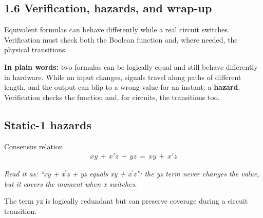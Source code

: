 \documentclass[11pt]{article}
\begin{document}
\begin{keepsection}
\section{1.6 Verification, hazards, and wrap-up}

Equivalent formulas can behave differently while a real circuit switches. Verification must check both the Boolean function and, where needed, the physical transitions.

\begin{plainbox}\textbf{In plain words:} two formulas can be logically equal and still behave differently in hardware. While an input changes, signals travel along paths of different length, and the output can blip to a wrong value for an instant: a \textbf{hazard}. Verification checks the function and, for circuits, the transitions too.\end{plainbox}

\begin{keepsection}
\subsection{Static-1 hazards}

\begin{equationcard}{Consensus relation}
\[ \begin{gathered} {x}{y}\, +\, {x}'{z}\, +\, {y}{z}\, =\, {x}{y}\, +\, {x}'{z} \end{gathered} \]
{\small \emph{Read it as: “xy + x\ensuremath{{}^{\prime}}z + yz equals xy + x\ensuremath{{}^{\prime}}z”: the yz term never changes the value, but it covers the moment when x switches.}\par The term yz is logically redundant but can preserve coverage during a circuit transition.}
\end{equationcard}


\end{keepsection}
\end{keepsection}
\end{document}
